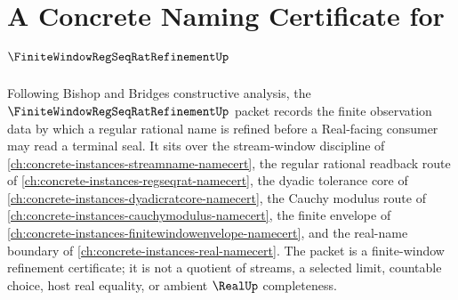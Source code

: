 \chapter{A Concrete Naming Certificate for $\FiniteWindowRegSeqRatRefinementUp$}
\label{ch:concrete-instances-finite-window-regseqrat-refinement-namecert}

Following Bishop and Bridges constructive analysis, the $\FiniteWindowRegSeqRatRefinementUp$ packet records the finite observation data by which a regular rational name is refined before a Real-facing consumer may read a terminal seal. It sits over the stream-window discipline of \autoref{ch:concrete-instances-streamname-namecert}, the regular rational readback route of \autoref{ch:concrete-instances-regseqrat-namecert}, the dyadic tolerance core of \autoref{ch:concrete-instances-dyadicratcore-namecert}, the Cauchy modulus route of \autoref{ch:concrete-instances-cauchymodulus-namecert}, the finite envelope of \autoref{ch:concrete-instances-finitewindowenvelope-namecert}, and the real-name boundary of \autoref{ch:concrete-instances-real-namecert}. The packet is a finite-window refinement certificate; it is not a quotient of streams, a selected limit, countable choice, host real equality, or ambient $\RealUp$ completeness.


